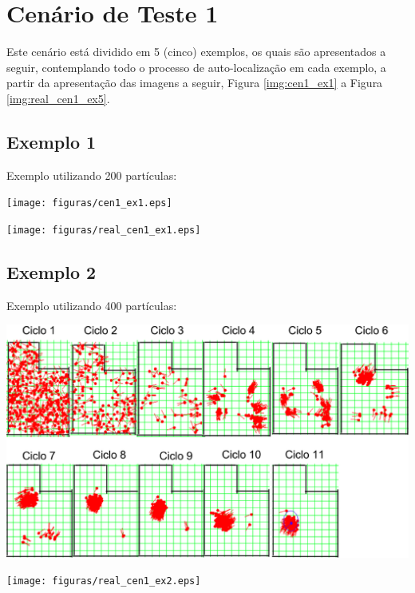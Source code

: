 \section{Cenário de Teste 1}
\label{sec:cenario1}

Este cenário está dividido em 5 (cinco) exemplos, os quais são apresentados a seguir, contemplando todo o processo de auto-localização
em cada exemplo, a partir da apresentação das imagens a seguir, Figura \ref{img:cen1_ex1} a Figura \ref{img:real_cen1_ex5}.

\subsection{Exemplo 1}

Exemplo utilizando 200 partículas:

{\centering
\texttt{[image: figuras/cen1\_ex1.eps]}
\label{img:cen1_ex1}
\par}

{\centering
\texttt{[image: figuras/real\_cen1\_ex1.eps]}
\label{img:real_cen1_ex1}
\par}

\subsection{Exemplo 2}

Exemplo utilizando 400 partículas:

{\centering
\includegraphics[scale=0.4]{figuras/cen1_ex2.eps}
\label{img:cen1_ex2}
\par}

{\centering
\texttt{[image: figuras/real\_cen1\_ex2.eps]}
\label{img:real_cen1_ex2}
\par}

